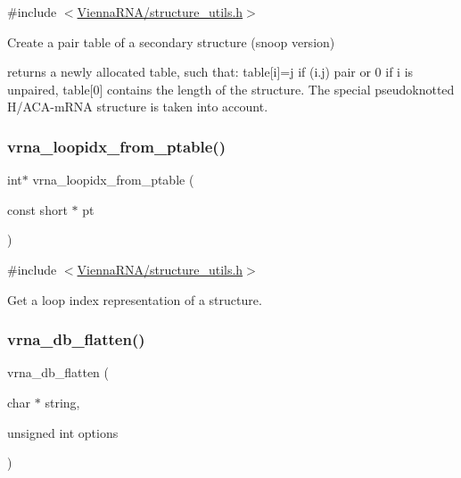 {\ttfamily \#include $<$\mbox{\hyperlink{structure__utils_8h}{Vienna\+R\+N\+A/structure\+\_\+utils.\+h}}$>$}



Create a pair table of a secondary structure (snoop version) 

returns a newly allocated table, such that\+: table\mbox{[}i\mbox{]}=j if (i.\+j) pair or 0 if i is unpaired, table\mbox{[}0\mbox{]} contains the length of the structure. The special pseudoknotted H/\+A\+C\+A-\/m\+R\+NA structure is taken into account. \mbox{\label{group__struct__utils_ga03e15af299be0866ff21da880c74b92e}} 
\subsubsection{\texorpdfstring{vrna\+\_\+loopidx\+\_\+from\+\_\+ptable()}{vrna\_loopidx\_from\_ptable()}}
{\footnotesize\ttfamily int$\ast$ vrna\+\_\+loopidx\+\_\+from\+\_\+ptable (\begin{DoxyParamCaption}\item[{const short $\ast$}]{pt }\end{DoxyParamCaption})}



{\ttfamily \#include $<$\mbox{\hyperlink{structure__utils_8h}{Vienna\+R\+N\+A/structure\+\_\+utils.\+h}}$>$}



Get a loop index representation of a structure. 

\mbox{\label{group__struct__utils_gae966b9f44168a4f4b39ca42ffb5f37b7}} 
\subsubsection{\texorpdfstring{vrna\+\_\+db\+\_\+flatten()}{vrna\_db\_flatten()}}
{\footnotesize\ttfamily vrna\+\_\+db\+\_\+flatten (\begin{DoxyParamCaption}\item[{char $\ast$}]{string,  }\item[{unsigned int}]{options }\end{DoxyParamCaption})}



